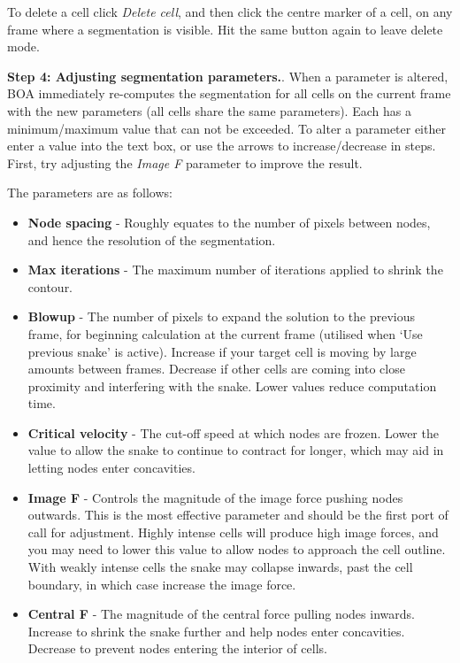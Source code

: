 \documentclass[a4paper,12pt]{article}
\begin{document}
To delete a cell click \textit{Delete cell}, and then click the centre marker of a cell, on any frame where a segmentation is visible.  Hit the same 
button again to leave delete mode.


\textbf{Step 4: Adjusting segmentation parameters.}.\label{step4}  When a parameter is altered, BOA immediately re-computes the segmentation
for all cells on the current frame with the new parameters (all cells share the same parameters).  Each has a minimum/maximum
value that can not be exceeded.  To alter a parameter either enter a value into the text box, or use the arrows to increase/decrease in steps.
First, try adjusting the \textit{Image F} parameter to improve the result.

The parameters are as follows:

\begin{itemize}
\item \textbf{Node spacing} - Roughly equates to the number of pixels between nodes, and hence the resolution of the segmentation.
\item \textbf{Max iterations} - The maximum number of iterations applied to shrink the contour.
\item \textbf{Blowup} - The number of pixels to expand the solution to the previous frame, for beginning 
calculation at the current frame (utilised when `Use previous snake' is active).  Increase if your target cell is moving by large 
amounts between frames.  Decrease if other cells are coming into close proximity and interfering with the snake.  Lower
values reduce computation time.
\item \textbf{Critical velocity} - The cut-off speed at which nodes are frozen.  Lower the value to allow the snake to continue 
to contract for longer, which may aid in letting nodes enter concavities.
\item \textbf{Image F} - Controls the magnitude of the image force pushing nodes outwards.  This is the most effective parameter 
and should be the first port of call for adjustment.  Highly intense cells will produce high image forces, and you may need to lower 
this value to allow nodes to approach the cell outline.  With weakly intense cells the snake may collapse inwards, past the cell 
boundary, in which case increase the image force.
\item \textbf{Central F} - The magnitude of the central force pulling nodes inwards.  Increase to shrink the snake further and help nodes enter concavities.
Decrease to prevent nodes entering the interior of cells. 

\end{itemize}
\end{document}
